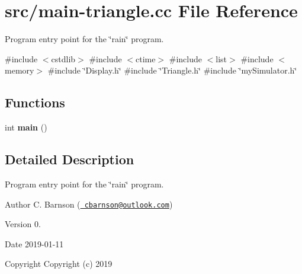 \hypertarget{main-triangle_8cc}{}\section{src/main-\/triangle.cc File Reference}
\label{main-triangle_8cc}


Program entry point for the \char`\"{}rain\char`\"{} program.  


{\ttfamily \#include $<$cstdlib$>$}\newline
{\ttfamily \#include $<$ctime$>$}\newline
{\ttfamily \#include $<$list$>$}\newline
{\ttfamily \#include $<$memory$>$}\newline
{\ttfamily \#include \char`\"{}Display.\+h\char`\"{}}\newline
{\ttfamily \#include \char`\"{}Triangle.\+h\char`\"{}}\newline
{\ttfamily \#include \char`\"{}my\+Simulator.\+h\char`\"{}}\newline
\subsection*{Functions}
\begin{DoxyCompactItemize}
\item 
\mbox{\label{main-triangle_8cc_ae66f6b31b5ad750f1fe042a706a4e3d4}} 
int {\bfseries main} ()
\end{DoxyCompactItemize}


\subsection{Detailed Description}
Program entry point for the \char`\"{}rain\char`\"{} program. 

\begin{DoxyAuthor}{Author}
C. Barnson (\href{mailto:cbarnson@outlook.com}{\texttt{ cbarnson@outlook.\+com}}) 
\end{DoxyAuthor}
\begin{DoxyVersion}{Version}
0. 
\end{DoxyVersion}
\begin{DoxyDate}{Date}
2019-\/01-\/11
\end{DoxyDate}
\begin{DoxyCopyright}{Copyright}
Copyright (c) 2019 
\end{DoxyCopyright}

